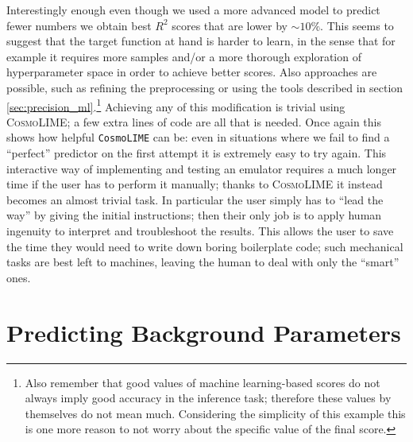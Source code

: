Interestingly enough even though we used a more advanced model to predict fewer numbers we obtain best $R^2$ scores that are lower by $\sim 10\%$. This seems to suggest that the target function at hand is harder to learn, in the sense that for example it requires more samples and/or a more thorough exploration of hyperparameter space in order to achieve better scores. Also approaches are possible, such as refining the preprocessing or using the tools described in section \ref{sec:precision_ml}.\footnote{Also remember that good values of machine learning-based scores do not always imply good accuracy in the inference task; therefore these values by themselves do not mean much. Considering the simplicity of this example this is one more reason to not worry about the specific value of the final score.}
Achieving any of this modification is trivial using \textsc{CosmoLIME}; a few extra lines of code are all that is needed. 
Once again this shows how helpful \texttt{CosmoLIME} can be: even in situations where we fail to find a ``perfect'' predictor on the first attempt it is extremely easy to try again. This interactive way of implementing and testing an emulator requires a much longer time if the user has to perform it manually; thanks to \textsc{CosmoLIME} it instead becomes an almost trivial task.
In particular the user simply has to ``lead the way'' by giving the initial instructions; then their only job is to apply human ingenuity to interpret and troubleshoot the results. This allows the user to save the time they would need to write down boring boilerplate code; such mechanical tasks are best left to machines, leaving the human to deal with only the ``smart'' ones.


\section{Predicting Background Parameters}\label{sec:predicting_background_parameters}



